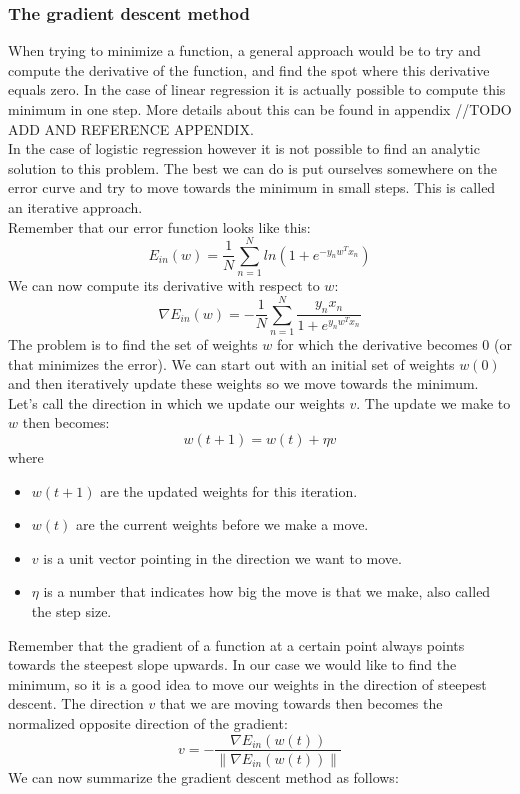 \subsubsection{The gradient descent method}
When trying to minimize a function, a general approach would be to try and compute the derivative of the function, and find the spot where this derivative equals zero. In the case of linear regression it is actually possible to compute this minimum in one step. More details about this can be found in appendix //TODO ADD AND REFERENCE APPENDIX. \\
In the case of logistic regression however it is not possible to find an analytic solution to this problem. The best we can do is put ourselves somewhere on the error curve and try to move towards the minimum in small steps. This is called an iterative approach. \\
Remember that our error function looks like this:
$$
E_{in}(w) = \frac{1}{N}\sum_{n=1}^{N}ln(1+e^{-y_{n}w^{T}x_{n}})
$$
We can now compute its derivative with respect to $w$:
$$
\nabla E_{in}(w) = -\frac{1}{N}\sum_{n=1}^{N}\frac{y_{n}x_{n}}{1+e^{y_{n}w^{T}x_{n}}}
$$
The problem is to find the set of weights $w$ for which the derivative becomes 0 (or that minimizes the error). We can start out with an initial set of weights $w(0)$ and then iteratively update these weights so we move towards the minimum. Let's call the direction in which we update our weights $v$. The update we make to $w$ then becomes:
$$
w(t+1) = w(t) + \eta v
$$
where
\begin{itemize}
	\item $w(t+1)$ are the updated weights for this iteration.
	\item $w(t)$ are the current weights before we make a move.
	\item $v$ is a unit vector pointing in the direction we want to move.
	\item $\eta$ is a number that indicates how big the move is that we make, also called the step size.
\end{itemize}
Remember that the gradient of a function at a certain point always points towards the steepest slope upwards. In our case we would like to find the minimum, so it is a good idea to move our weights in the direction of steepest descent. The direction $v$ that we are moving towards then becomes the normalized opposite direction of the gradient:
$$
v = -\frac{\nabla E_{in}(w(t))}{\lVert\nabla E_{in}(w(t))\rVert}
$$
We can now summarize the gradient descent method as follows: \\ \\

